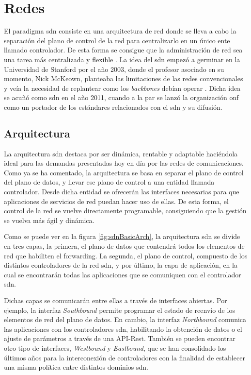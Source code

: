 \section{Redes  }
\label{sec:sdn}


El paradigma \gls{sdn} \cite{nadeau2013sdn} consiste en una arquitectura de red donde se lleva a cabo la separación del plano de control de la red para centralizarlo en un único ente llamado controlador. De esta forma se consigue que la administración de red sea una tarea más centralizada y flexible \cite{nadeau2013sdn}. La idea del \gls{sdn} empezó a germinar en la Universidad de Stanford por el año 2003, donde el profesor asociado en su momento, Nick McKeown, planteaba las limitaciones de las redes convencionales y veía la necesidad de replantear como los \textit{backbones} debían operar \cite{sdnBegins}. Dicha idea se acuñó como \gls{sdn} en el año 2011, cuando a la par se lanzó la organización \gls{onf} \cite{onf} como un portador de los estándares relacionados con el \gls{sdn} y su difusión.

\subsection{Arquitectura}

La arquitectura \gls{sdn} destaca por ser dinámica, rentable y adaptable haciéndola ideal para las demandas presentadas hoy en día por las redes de comunicaciones. Como ya se ha comentado, la arquitectura se basa en separar el plano de control del plano de datos, y llevar ese plano de control a una entidad llamada controlador. Desde dicha entidad se ofrecerán las interfaces necesarias para que aplicaciones de servicios de red puedan hacer uso de ellas. De esta forma, el control de la red se vuelve directamente programable, consiguiendo que la gestión se vuelva más ágil y dinámica.\\
\par

Como se puede ver en la figura \ref{fig:sdnBasicArch}, la arquitectura \gls{sdn} se divide en tres capas, la primera, el plano de datos que contendrá todos los elementos de red que habiliten el forwarding. La segunda, el plano de control, compuesto de los distintos controladores de la red \gls{sdn}, y por último, la capa de aplicación, en la cual se encontrarán todas las aplicaciones que se comuniquen con el controlador \gls{sdn}. \\
\par
Dichas capas se comunicarán entre ellas a través de interfaces abiertas. Por ejemplo, la interfaz \textit{Southbound} permite programar el estado de reenvío de los elementos de red del plano de datos. En cambio, la interfaz \textit{Northbound} comunica las aplicaciones con los controladores \gls{sdn}, habilitando la obtención de datos o el ajuste de parámetros a través de una API-Rest. También se pueden encontrar otro tipo de interfaces, \textit{Westbound} y \textit{Eastbound}, que se han consolidado los últimos años para la interconexión de controladores con la finalidad de establecer una misma política entre distintos dominios \gls{sdn}.

